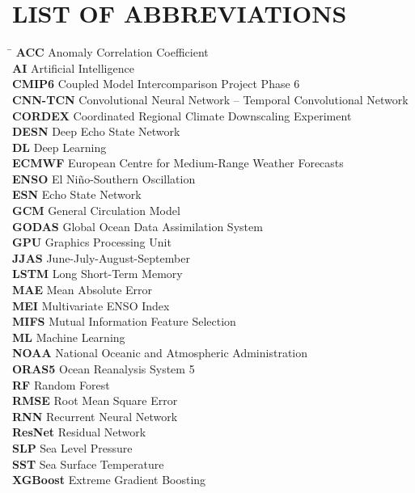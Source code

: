 \chapter*{LIST OF ABBREVIATIONS}

\bigskip

\begin{tabbing}
\hspace*{3cm}\=\kill
\textbf{ACC} \> Anomaly Correlation Coefficient \\
\textbf{AI} \> Artificial Intelligence \\
\textbf{CMIP6} \> Coupled Model Intercomparison Project Phase 6 \\
\textbf{CNN-TCN} \> Convolutional Neural Network -- Temporal Convolutional Network \\
\textbf{CORDEX} \> Coordinated Regional Climate Downscaling Experiment \\
\textbf{DESN} \> Deep Echo State Network \\
\textbf{DL} \> Deep Learning \\
\textbf{ECMWF} \> European Centre for Medium-Range Weather Forecasts \\
\textbf{ENSO} \> El Ni\~{n}o-Southern Oscillation \\
\textbf{ESN} \> Echo State Network \\
\textbf{GCM} \> General Circulation Model \\
\textbf{GODAS} \> Global Ocean Data Assimilation System \\
\textbf{GPU} \> Graphics Processing Unit \\
\textbf{JJAS} \> June-July-August-September \\
\textbf{LSTM} \> Long Short-Term Memory \\
\textbf{MAE} \> Mean Absolute Error \\
\textbf{MEI} \> Multivariate ENSO Index \\
\textbf{MIFS} \> Mutual Information Feature Selection \\
\textbf{ML} \> Machine Learning \\
\textbf{NOAA} \> National Oceanic and Atmospheric Administration \\
\textbf{ORAS5} \> Ocean Reanalysis System 5 \\
\textbf{RF} \> Random Forest \\
\textbf{RMSE} \> Root Mean Square Error \\
\textbf{RNN} \> Recurrent Neural Network \\
\textbf{ResNet} \> Residual Network \\
\textbf{SLP} \> Sea Level Pressure \\
\textbf{SST} \> Sea Surface Temperature \\
\textbf{XGBoost} \> Extreme Gradient Boosting \\
\end{tabbing}
